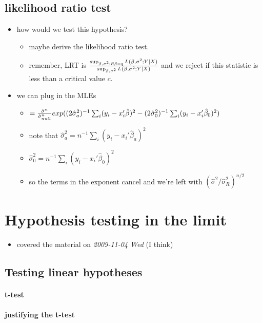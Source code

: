 \subsection{likelihood ratio test}
\label{sec-2-4}

\begin{itemize}
\item how would we test this hypothesis?
\begin{itemize}
\item maybe derive the likelihood ratio test.
\item remember, LRT is ${\sup_{\beta, \sigma^2: R\beta = q} L(\beta,
         \sigma^2; Y \mid X) \over \sup_{\beta, \sigma^2} L(\beta,
         \sigma^2; Y \mid X)}$ and we reject if this statistic is less
         than a critical value $c$.
\end{itemize}
\item we can plug in the MLEs
\begin{itemize}
\item $= {\hat\sigma^n \over \hat\sigma^n_{null}}
         exp((2\hat\sigma^2_a)^{-1} \sum_i (y_i -
         x_i'\hat\beta)^2 - (2\hat\sigma^2_0)^{-1} \sum_i (y_i - x_i'\hat\beta_0)^2)$
\item note that $\hat\sigma^2_a = n^{-1} \sum_i (y_i -
         x_i'\hat\beta_a)^2$
\item $\hat\sigma^2_0 = n^{-1} \sum_i (y_i - x_i'\hat\beta_0)^2$
\item so the terms in the exponent cancel and we're left with
         $(\hat\sigma^2 / \hat\sigma^2_R)^{n/2}$
\end{itemize}
\end{itemize}
\section{Hypothesis testing in the limit}
\label{sec-3}

\begin{itemize}
\item covered the material on \textit{2009-11-04 Wed} (I think)
\end{itemize}
\subsection{Testing linear hypotheses}
\label{sec-3-1}
\paragraph{t-test}
\label{sec-3-1-1}
\paragraph{justifying the t-test}
\label{sec-3-1-1-1}

